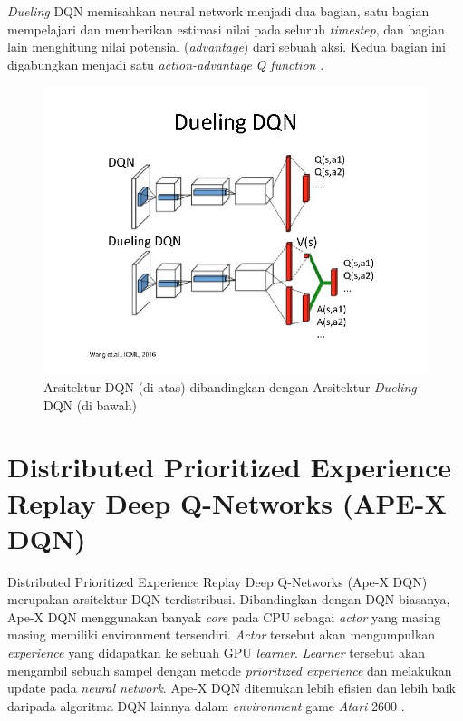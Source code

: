 \emph{Dueling} DQN memisahkan neural network menjadi dua bagian, satu bagian mempelajari dan memberikan estimasi nilai pada seluruh \emph{timestep},
dan bagian lain menghitung nilai potensial (\emph{advantage}) dari sebuah aksi.
Kedua bagian ini digabungkan menjadi satu \emph{action-advantage Q function} \citep{duelingDQN}.

\begin{figure}[H]
  \centering
    \includegraphics[scale=0.35]{gambar/dqn_vs_dueling_dqn_architecture.jpg}
    \caption{Arsitektur DQN (di atas) dibandingkan dengan Arsitektur \emph{Dueling} DQN (di bawah)}
    \label{fig:dqnVsDuelingDqnArchitecture}
\end{figure}

\section{Distributed Prioritized Experience Replay Deep Q-Networks (APE-X DQN)}

Distributed Prioritized Experience Replay Deep Q-Networks (Ape-X DQN) merupakan arsitektur DQN terdistribusi.
Dibandingkan dengan DQN biasanya, Ape-X DQN menggunakan banyak \emph{core} pada CPU sebagai \emph{actor} yang masing masing memiliki environment tersendiri.
\emph{Actor} tersebut akan mengumpulkan \emph{experience} yang didapatkan ke sebuah GPU \emph{learner}. 
\emph{Learner} tersebut akan mengambil sebuah sampel dengan metode \emph{prioritized experience} dan melakukan update pada \emph{neural network}. 
Ape-X DQN ditemukan lebih efisien dan lebih baik daripada algoritma DQN lainnya dalam \emph{environment} game \emph{Atari} 2600 \citep{apexDQN}.

